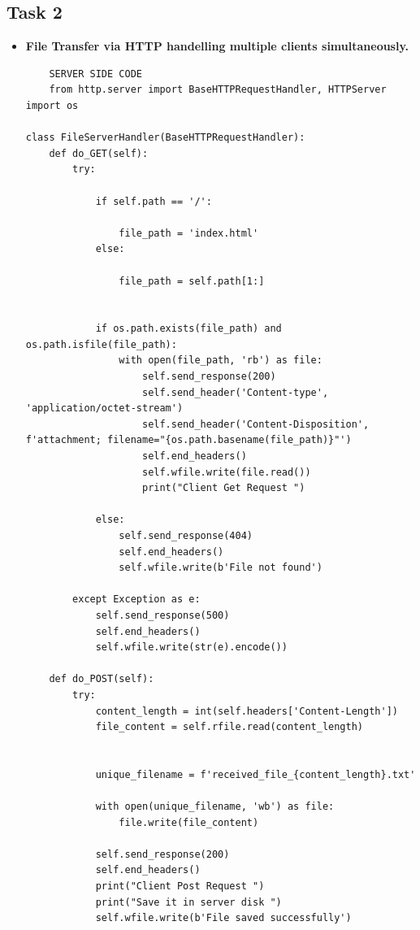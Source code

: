 \documentclass[11pt]{article}
\begin{document}
 
\subsection{Task 2}
\begin{itemize}
\item \textbf{File Transfer via  HTTP handelling multiple clients simultaneously.}
    \begin{verbatim}
    SERVER SIDE CODE
    from http.server import BaseHTTPRequestHandler, HTTPServer
import os

class FileServerHandler(BaseHTTPRequestHandler):
    def do_GET(self):
        try:
            
            if self.path == '/':
            
                file_path = 'index.html' 
            else:
                
                file_path = self.path[1:]


            if os.path.exists(file_path) and os.path.isfile(file_path):
                with open(file_path, 'rb') as file:
                    self.send_response(200)
                    self.send_header('Content-type', 'application/octet-stream')
                    self.send_header('Content-Disposition', f'attachment; filename="{os.path.basename(file_path)}"')
                    self.end_headers()
                    self.wfile.write(file.read())
                    print("Client Get Request ")
            
            else:
                self.send_response(404)
                self.end_headers()
                self.wfile.write(b'File not found')

        except Exception as e:
            self.send_response(500)
            self.end_headers()
            self.wfile.write(str(e).encode())

    def do_POST(self):
        try:
            content_length = int(self.headers['Content-Length'])
            file_content = self.rfile.read(content_length)
            
           
            unique_filename = f'received_file_{content_length}.txt'
            
            with open(unique_filename, 'wb') as file:
                file.write(file_content)

            self.send_response(200)
            self.end_headers()
            print("Client Post Request ")
            print("Save it in server disk ")
            self.wfile.write(b'File saved successfully')


\end{verbatim}
\end{itemize}
\end{document}

